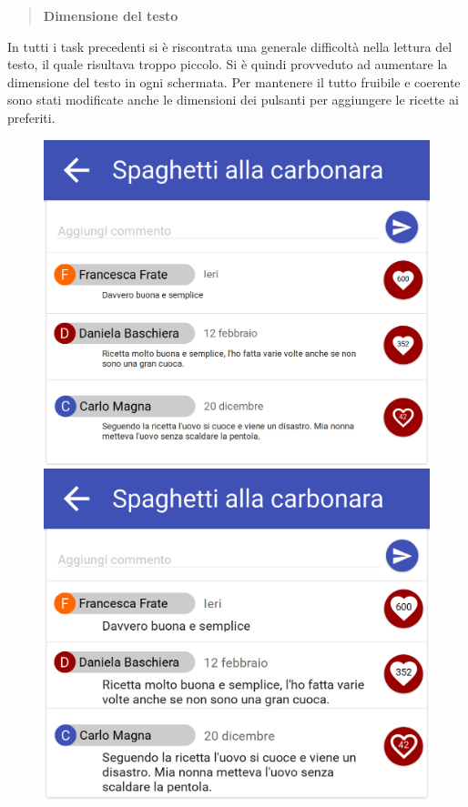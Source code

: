 \begin{quote}
	\textbf{Dimensione del testo}
\end{quote}
In tutti i task precedenti si è riscontrata una generale difficoltà nella
lettura del testo, il quale risultava troppo piccolo.  Si è quindi provveduto ad
aumentare la dimensione del testo in ogni schermata.  Per mantenere il tutto
fruibile e coerente sono stati modificate anche le dimensioni dei pulsanti per
aggiungere le ricette ai preferiti.

\begin{figure}[H]
	\begin{minipage}{.49\textwidth}
		\includegraphics[width=\textwidth]{img/modifiche/commenti_old.png}
	\end{minipage}
	\begin{minipage}{.49\textwidth}
		\includegraphics[width=\textwidth]{img/modifiche/commenti_new.png}
	\end{minipage}
\end{figure}

